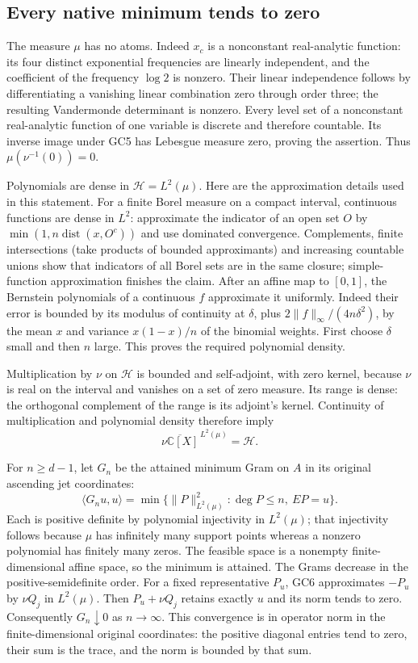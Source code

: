 \documentclass[11pt,a4paper]{article}
\theoremstyle{definition}\newtheorem{definition}[theorem]{Definition}
\newcommand{\C}{\mathbb C}\newcommand{\R}{\mathbb R}
\begin{document}
\subsection{Every native minimum tends to zero}
The measure $\mu$ has no atoms. Indeed $x_c$ is a nonconstant
real-analytic function: its four distinct exponential frequencies
are linearly independent, and the coefficient of the frequency
$\log2$ is nonzero. Their linear independence follows by
differentiating a vanishing linear combination zero through
order three; the resulting Vandermonde determinant is nonzero.
Every level set of a nonconstant real-analytic function of one
variable is discrete and therefore countable. Its inverse
image under GC5 has Lebesgue measure zero, proving the assertion.
Thus $\mu(\nu^{-1}(0))=0$.

Polynomials are dense in $\mathcal H=L^2(\mu)$.
Here are the approximation details used in this statement.
For a finite Borel measure on a compact interval, continuous
functions are dense in $L^2$: approximate the indicator of an
open set $O$ by $\min(1,n\operatorname{dist}(x,O^c))$ and use
dominated convergence. Complements, finite intersections (take
products of bounded approximants) and increasing countable
unions show that indicators of all Borel sets are in the same
closure; simple-function approximation finishes the claim.
After an affine map to $[0,1]$, the Bernstein polynomials of a
continuous $f$ approximate it uniformly. Indeed their error is
bounded by its modulus of continuity at $\delta$, plus
$2\|f\|_\infty/(4n\delta^2)$, by the mean $x$ and variance
$x(1-x)/n$ of the binomial weights. First choose $\delta$ small
and then $n$ large. This proves the required polynomial density.

Multiplication by $\nu$ on $\mathcal H$ is bounded and
self-adjoint, with zero kernel, because $\nu$ is real on the
interval and vanishes on a set of zero measure. Its range is
dense: the orthogonal complement of the range is its adjoint's
kernel. Continuity of multiplication and polynomial density
therefore imply
\[
 \overline{\nu\C[X]}^{\,L^2(\mu)}=\mathcal H.
 \tag{GC6}\label{gc:relation-closure}
\]

For $n\ge d-1$, let $G_n$ be the attained minimum Gram on $A$
in its original ascending jet coordinates:
\[
 \langle G_nu,u\rangle
 =\min\{\|P\|_{L^2(\mu)}^2:\deg P\le n,\ EP=u\}.
 \tag{GC7}\label{gc:minimum}
\]
Each is positive definite by polynomial injectivity in $L^2(\mu)$;
that injectivity follows because $\mu$ has infinitely many
support points whereas a nonzero polynomial has finitely many
zeros. The feasible space is a nonempty finite-dimensional affine
space, so the minimum is attained. The Grams decrease in the
positive-semidefinite order. For a fixed representative $P_u$,
GC6 approximates $-P_u$ by $\nu Q_j$ in $L^2(\mu)$.
Then $P_u+\nu Q_j$ retains exactly $u$ and its norm tends to zero.
Consequently $G_n\downarrow0$ as $n\to\infty$.
This convergence is in operator norm in the finite-dimensional
original coordinates: the positive diagonal entries tend to
zero, their sum is the trace, and the norm is bounded by that sum.
\end{document}
